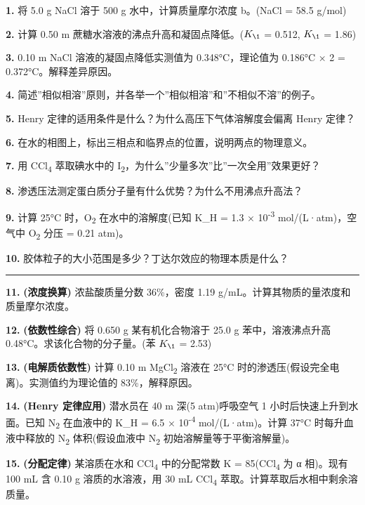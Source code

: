 \documentclass[a4paper,11pt]{ctexart}
\begin{document}
\textbf{1.} 将 5.0 g NaCl 溶于 500 g 水中，计算质量摩尔浓度 b。(NaCl = 58.5 g/mol)

\textbf{2.} 计算 0.50 m 蔗糖水溶液的沸点升高和凝固点降低。(\(K_{\1}\) = 0.512, \(K_{\1}\) = 1.86)

\textbf{3.} 0.10 m NaCl 溶液的凝固点降低实测值为 0.348°C，理论值为 0.186°C × 2 = 0.372°C。解释差异原因。

\textbf{4.} 简述''相似相溶''原则，并各举一个''相似相溶''和''不相似不溶''的例子。

\textbf{5.} Henry 定律的适用条件是什么？为什么高压下气体溶解度会偏离 Henry 定律？

\textbf{6.} 在水的相图上，标出三相点和临界点的位置，说明两点的物理意义。

\textbf{7.} 用 CCl\textsubscript{4} 萃取碘水中的 I\textsubscript{2}，为什么''少量多次''比''一次全用''效果更好？

\textbf{8.} 渗透压法测定蛋白质分子量有什么优势？为什么不用沸点升高法？

\textbf{9.} 计算 25°C 时，O\textsubscript{2} 在水中的溶解度(已知 K\_H = 1.3 × 10\textsuperscript{-3} mol/(L·atm)，空气中 O\textsubscript{2} 分压 = 0.21 atm)。

\textbf{10.} 胶体粒子的大小范围是多少？丁达尔效应的物理本质是什么？

\begin{center}\rule{0.5\linewidth}{0.5pt}\end{center}

\textbf{11.} \textbf{(浓度换算)} 浓盐酸质量分数 36\%，密度 1.19 g/mL。计算其物质的量浓度和质量摩尔浓度。

\textbf{12.} \textbf{(依数性综合)} 将 0.650 g 某有机化合物溶于 25.0 g 苯中，溶液沸点升高 0.48°C。求该化合物的分子量。(苯 \(K_{\1}\) = 2.53)

\textbf{13.} \textbf{(电解质依数性)} 计算 0.10 m MgCl\textsubscript{2} 溶液在 25°C 时的渗透压(假设完全电离)。实测值约为理论值的 83\%，解释原因。

\textbf{14.} \textbf{(Henry 定律应用)} 潜水员在 40 m 深(5 atm)呼吸空气 1 小时后快速上升到水面。已知 N\textsubscript{2} 在血液中的 K\_H = 6.5 × 10\textsuperscript{-4} mol/(L·atm)。计算 37°C 时每升血液中释放的 N\textsubscript{2} 体积(假设血液中 N\textsubscript{2} 初始溶解量等于平衡溶解量)。

\textbf{15.} \textbf{(分配定律)} 某溶质在水和 CCl\textsubscript{4} 中的分配常数 K = 85(CCl\textsubscript{4} 为 α 相)。现有 100 mL 含 0.10 g 溶质的水溶液，用 30 mL CCl\textsubscript{4} 萃取。计算萃取后水相中剩余溶质量。
\end{document}
